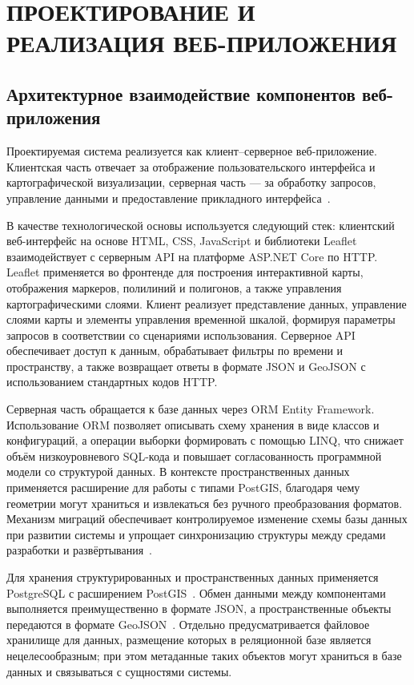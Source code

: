 \chapter{ПРОЕКТИРОВАНИЕ И РЕАЛИЗАЦИЯ ВЕБ-ПРИЛОЖЕНИЯ}

\section{Архитектурное взаимодействие компонентов веб-приложения}

Проектируемая система реализуется как клиент--серверное веб-приложение. Клиентская часть отвечает за отображение пользовательского интерфейса и картографической визуализации, серверная часть --- за обработку запросов, управление данными и предоставление прикладного интерфейса~\cite{lock_aspnet_core_in_action}.

В качестве технологической основы используется следующий стек: клиентский веб-интерфейс на основе HTML, CSS, JavaScript и библиотеки Leaflet взаимодействует с серверным API на платформе ASP.NET Core по HTTP. Leaflet применяется во фронтенде для построения интерактивной карты, отображения маркеров, полилиний и полигонов, а также управления картографическими слоями. Клиент реализует представление данных, управление слоями карты и элементы управления временной шкалой, формируя параметры запросов в соответствии со сценариями использования. Серверное API обеспечивает доступ к данным, обрабатывает фильтры по времени и пространству, а также возвращает ответы в формате JSON и GeoJSON с использованием стандартных кодов HTTP.

Серверная часть обращается к базе данных через ORM Entity Framework. Использование ORM позволяет описывать схему хранения в виде классов и конфигураций, а операции выборки формировать с помощью LINQ, что снижает объём низкоуровневого SQL-кода и повышает согласованность программной модели со структурой данных. В контексте пространственных данных применяется расширение для работы с типами PostGIS, благодаря чему геометрии могут храниться и извлекаться без ручного преобразования форматов. Механизм миграций обеспечивает контролируемое изменение схемы базы данных при развитии системы и упрощает синхронизацию структуры между средами разработки и развёртывания~\cite{efcore_overview,efcore_spatial}.

Для хранения структурированных и пространственных данных применяется PostgreSQL с расширением PostGIS~\cite{postgis_manual}. Обмен данными между компонентами выполняется преимущественно в формате JSON, а пространственные объекты передаются в формате GeoJSON~\cite{rfc7946}. Отдельно предусматривается файловое хранилище для данных, размещение которых в реляционной базе является нецелесообразным; при этом метаданные таких объектов могут храниться в базе данных и связываться с сущностями системы.

